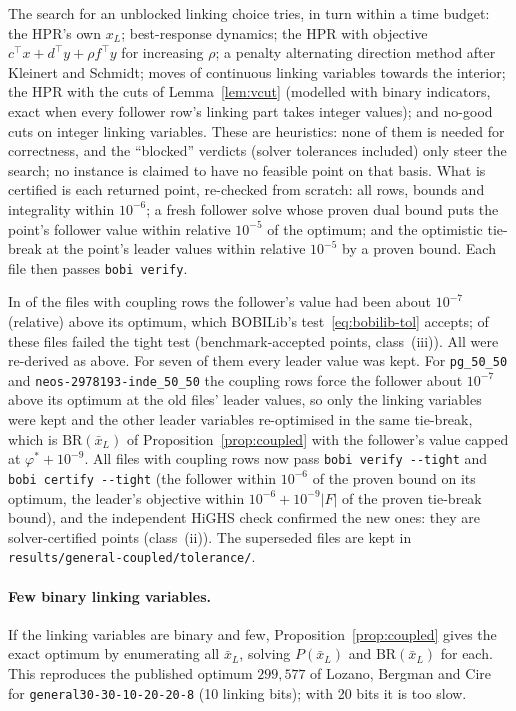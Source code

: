The search for an unblocked linking choice tries, in turn within a time
budget: the HPR's own $x_L$; best-response dynamics; the HPR with objective
$c^{\top}x+d^{\top}y+\rho f^{\top}y$ for increasing $\rho$; a penalty alternating
direction method after Kleinert and Schmidt;\cite{kleinert2021computing} moves of continuous linking
variables towards the interior; the HPR with the cuts of
Lemma~\ref{lem:vcut} (modelled with binary indicators, exact when every
follower row's linking part takes integer values); and no-good cuts on
integer linking variables. These are heuristics: none of them is needed for
correctness, and the ``blocked'' verdicts (solver tolerances included) only
steer the search; no instance is claimed to have no feasible point on that
basis. What is certified is each returned point, re-checked from scratch: all
rows, bounds and integrality within $10^{-6}$; a fresh follower solve whose
proven dual bound puts the point's follower value within relative $10^{-5}$ of
the optimum; and the optimistic tie-break at the point's leader values within
relative $10^{-5}$ by a proven bound. Each file then passes \texttt{bobi
verify}.

In \NumCoupledTightened{} of the files with coupling rows the follower's value had
been about $10^{-7}$ (relative) above its optimum, which BOBILib's
test~\eqref{eq:bobilib-tol} accepts; \NumTightSupersededCoupledBench{} of these
files failed the tight test (benchmark-accepted points, class~(iii)). All
\NumCoupledTightened{} were re-derived as above. For seven of them every leader
value was kept. For \texttt{pg\_50\_50} and \texttt{neos-2978193-inde\_50\_50} the
coupling rows force the follower about $10^{-7}$ above its optimum at the old
files' leader values, so only the linking variables were kept and the other
leader variables re-optimised in the same tie-break, which is
$\mathrm{BR}(\bar x_L)$ of Proposition~\ref{prop:coupled} with the follower's value
capped at $\varphi^{*}+10^{-9}$. All \NumCoupledFiles{} files with coupling rows now
pass \texttt{bobi verify -{}-tight} and \texttt{bobi certify -{}-tight} (the follower
within $10^{-6}$ of the proven bound on its optimum, the leader's objective within
$10^{-6}+10^{-9}|F|$ of the proven tie-break bound), and the independent HiGHS check
confirmed the \NumCoupledTightened{} new ones: they are solver-certified points
(class~(ii)). The superseded files are kept in
\texttt{results/general-coupled/tolerance/}.

\paragraph{Few binary linking variables.} If the linking variables are
binary and few, Proposition~\ref{prop:coupled} gives the exact optimum by
enumerating all $\bar x_L$, solving $P(\bar x_L)$ and $\mathrm{BR}(\bar x_L)$ for
each. This reproduces the published optimum $299{,}577$ of Lozano, Bergman
and Cire\cite{lozano2026network} for \texttt{general30-30-10-20-20-8} (10
linking bits); with 20 bits it is too slow.

